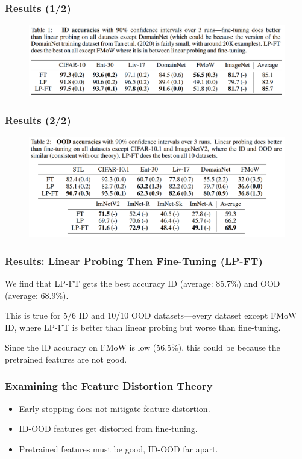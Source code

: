 \documentclass[16pt,aspectratio=169]{beamer}
\begin{document}
\begin{frame}
    \frametitle{Results (1/2)}

    \begin{figure}[htbp]
        \centering
        \includegraphics[width=\textwidth]{figures/table-1.png}
    \end{figure}

\end{frame}

\begin{frame}
    \frametitle{Results (2/2)}

    \begin{figure}[htbp]
        \centering
        \includegraphics[width=\textwidth]{figures/table-2.png}
    \end{figure}

\end{frame}

\begin{frame}
    \frametitle{Results: Linear Probing Then Fine-Tuning (LP-FT)}

    We find that LP-FT gets the best accuracy ID (average: 85.7\%) and OOD (average: 68.9\%).

    This is true for 5/6 ID and 10/10 OOD datasets---every dataset except FMoW ID, where LP-FT is better than linear probing but worse than fine-tuning.

    Since the ID accuracy on FMoW is low (56.5\%), this could be because the pretrained features are not good.

\end{frame}

\begin{frame}
    \frametitle{Examining the Feature Distortion Theory}

    \begin{itemize}
        \item Early stopping does not mitigate feature distortion.
        \item ID-OOD features get distorted from fine-tuning.
        \item Pretrained features must be good, ID-OOD far apart.
    \end{itemize}

\end{frame}
\end{document}
